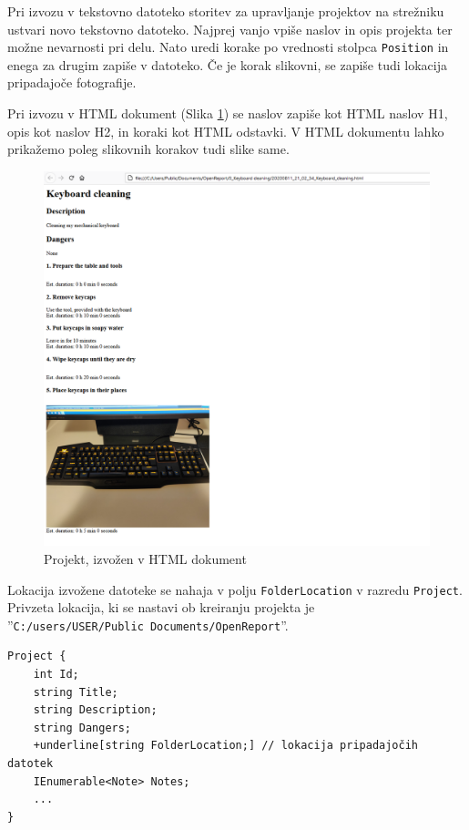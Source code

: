\documentclass[a4paper, 12pt]{book}
\begin{document}
Pri izvozu v tekstovno datoteko storitev za upravljanje projektov na strežniku ustvari novo tekstovno datoteko.
Najprej vanjo vpiše naslov in opis projekta ter možne nevarnosti pri delu.
Nato uredi korake po vrednosti stolpca \texttt{Position} in enega za drugim zapiše v datoteko.
Če je korak slikovni, se zapiše tudi lokacija pripadajoče fotografije.

Pri izvozu v HTML dokument (Slika \ref{export_html}) se naslov zapiše kot HTML naslov H1, opis kot naslov H2, in koraki kot HTML odstavki.
V HTML dokumentu lahko prikažemo poleg slikovnih korakov tudi slike same.

\begin{figure}[H]
\begin{center}
\includegraphics[width=13cm]{export_html}
\end{center}
\caption{Projekt, izvožen v HTML dokument}
\label{export_html}
\end{figure}

Lokacija izvožene datoteke se nahaja v polju \texttt{FolderLocation} v razredu \texttt{Project}.
Privzeta lokacija, ki se nastavi ob kreiranju projekta je 
\\''\texttt{C:/users/USER/Public Documents/OpenReport}''.

\begin{Verbatim}[commandchars=+\[\]]
Project {
    int Id; 
    string Title; 
    string Description; 
    string Dangers; 
    +underline[string FolderLocation;] // lokacija pripadajočih datotek 
    IEnumerable<Note> Notes; 
    ... 
}
\end{Verbatim}
\end{document}

